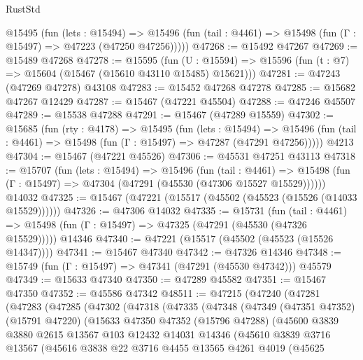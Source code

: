 \begin{lexlean}{RustStd}
\begin{coremodule}
    @15495
      (fun (lets : @15494) =>
      @15496 (fun (tail : @4461) => @15498 (fun (Γ : @15497) => @47223 (@47250 @47256)))))
@47268 := @15492 @47267
@47269 := @15489 @47268
@47278 := @15595
    (fun (U : @15594) => @15596 (fun (t : @7) => @15604 (@15467 (@15610 @43110 @15485) @15621)))
@47281 := @47243 (@47269 @47278) @43108
@47283 := @15452 @47268 @47278
@47285 := @15682 @47267 @12429
@47287 := @15467 (@47221 @45504)
@47288 := @47246 @45507
@47289 := @15538 @47288
@47291 := @15467 (@47289 @15559)
@47302 := @15685
    (fun (rty : @4178) =>
    @15495
      (fun (lets : @15494) =>
      @15496 (fun (tail : @4461) => @15498 (fun (Γ : @15497) => @47287 (@47291 @47256)))))
    @4213
@47304 := @15467 (@47221 @45526)
@47306 := @45531 @47251 @43113
@47318 := @15707
    (fun (lets : @15494) =>
    @15496
      (fun (tail : @4461) =>
      @15498 (fun (Γ : @15497) => @47304 (@47291 (@45530 (@47306 @15527 @15529))))))
    @14032
@47325 := @15467 (@47221 (@15517 (@45502 (@45523 (@15526 (@14033 @15529))))))
@47326 := @47306 @14032
@47335 := @15731
    (fun (tail : @4461) => @15498 (fun (Γ : @15497) => @47325 (@47291 (@45530 (@47326 @15529)))))
    @14346
@47340 := @47221 (@15517 (@45502 (@45523 (@15526 @14347))))
@47341 := @15467 @47340
@47342 := @47326 @14346
@47348 := @15749 (fun (Γ : @15497) => @47341 (@47291 (@45530 @47342))) @45579
@47349 := @15633 @47340
@47350 := @47289 @45582
@47351 := @15467 @47350
@47352 := @45586 @47342
@48511 := @47215
    (@47240
      (@47281
        (@47283
          (@47285
            (@47302
              (@47318
                (@47335
                  (@47348
                    (@47349
                      (@47351 @47352)
                      (@15791 @47220)
                      (@15633
                        @47350
                        @47352
                        (@15796 @47288)
                        (@45600
                          @3839
                          @3880
                          @2615
                          @13567
                          @103
                          @12432
                          @14031
                          @14346
                          (@45610
                            @3839
                            @3716
                            @13567
                            (@45616
                              @3838
                              @22
                              @3716
                              @4455
                              @13565
                              @4261
                              @4019
                              (@45625

\end{coremodule}
\end{lexlean}
